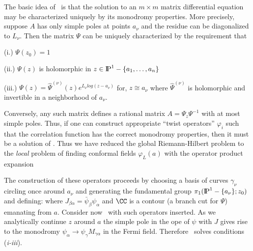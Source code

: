 
The basic idea of \holoii\ is that the solution to an $m\times m$
matrix differential equation 
\eqn{}
may be characterized uniquely by its monodromy properties. 
More precisely, suppose $A$ has only simple poles at points 
$a_\nu$ and the residue can be diagonalized to $L_\nu$. Then
the matrix $\Psi$ can be uniquely characterized by 
the requirement that 

(i.) $\Psi(z_0)=1$

(ii.) $\Psi(z)$ is holomorphic in $z\in\relax{\rm I\kern-.18em P}^1-\{a_1,\dots , a_n\}$

(iii.) $\Psi(z)=\hat \Psi^{(\nu)}(z)
e^{L_\nu log(z-a_\nu)}$ for, $z\cong a_\nu$
where $\hat \Psi^{(\nu)}$ is holomorphic and invertible in a neighborhood
of $a_\nu$. 

Conversely, any such matrix defines a rational matrix
$A=\Psi_z\Psi^{-1}$ with at most simple poles.
Thus, 
if one can construct appropriate ``twist operators'' 
$\varphi_i$
such that the correlation function 
\eqn{}
has the correct monodromy properties, then it must be a solution of 
\diffl . Thus we have reduced the global Riemann-Hilbert
problem to the {\it local} problem
of finding conformal fields $\varphi_{L}(a)$ with the operator 
product expansion 
\eqn{}

The construction of these operators proceeds by
choosing a basis of curves
$\gamma_\nu$ circling once around $a_\nu$ and generating the 
fundamental group $\pi_1(\relax{\rm I\kern-.18em P}^1-\{a_\nu\};z_0)$ 
and defining:
\eqn{}
where $J_{\beta\alpha}=\bar\psi_\beta\psi_\alpha$ 
and $\CC$ is a contour (a branch cut
for $\Psi$) emanating from $a$. Consider now \corr\  with such
operators inserted. As we analytically continue $z$ around
$a$ the simple pole in the ope of $\psi$ with $J$
gives rise to the monodromy $\psi_\alpha\to \psi_\gamma M_{\gamma\alpha}$
in the Fermi field. Therefore \corr\ solves 
conditions ({\it i-iii}). 

